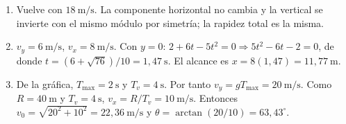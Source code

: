 \documentclass[12pt, letterpaper]{article}
\begin{document}
\begin{enumerate}[leftmargin=*, label=\textbf{\arabic*.}, start=15]
  \item Vuelve con $18\ \text{m/s}$. La componente horizontal no cambia y la
        vertical se invierte con el mismo módulo por simetría; la rapidez
        total es la misma.
  \item $v_y=6\ \text{m/s}$, $v_x=8\ \text{m/s}$. Con $y=0$:
        $2+6t-5t^2=0\Rightarrow5t^2-6t-2=0$, de donde
        $t=(6+\sqrt{76})/10=1{,}47\ \text{s}$. El alcance es
        $x=8(1{,}47)=11{,}77\ \text{m}$.
  \item De la gráfica, $T_{\max}=2\ \text{s}$ y $T_v=4\ \text{s}$. Por
        tanto $v_y=gT_{\max}=20\ \text{m/s}$. Como $R=40\ \text{m}$ y
        $T_v=4\ \text{s}$, $v_x=R/T_v=10\ \text{m/s}$. Entonces
        $v_0=\sqrt{20^2+10^2}=22{,}36\ \text{m/s}$ y
        $\theta=\arctan(20/10)=63{,}43^\circ$.
\end{enumerate}
\end{document}
